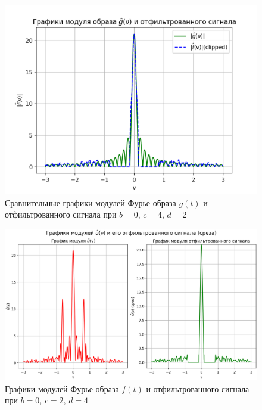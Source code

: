 \begin{figure}[ht!]
    \centering
    \includegraphics[scale=0.55]{media/1 task/specific_freq/Fourier_Image_Comparison_0_4_2_-0,805:-0,156.png}
    \caption{Сравнительные графики модулей Фурье-образа $g(t)$ и отфильтрованного сигнала при $b=0$,  $c=4$,  $d=2$}
    \label{fig:fourc_0_4_2}
\end{figure}

\clearpage

\begin{figure}[ht!]
    \centering
    \includegraphics[scale=0.55]{media/1 task/specific_freq/Fourier_Image_0_2_4_-0,805:-0,156.png}
    \caption{Графики модулей Фурье-образа $f(t)$ и отфильтрованного сигнала при $b=0$,  $c=2$,  $d=4$}
    \label{fig:four_0_2_4}
\end{figure}


